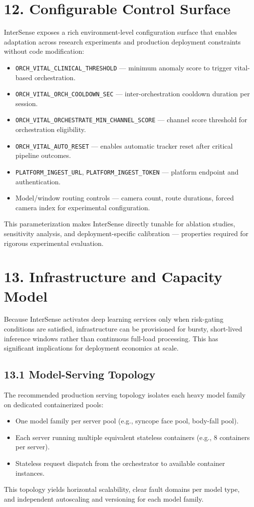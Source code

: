 \documentclass[11pt,a4paper]{article}
\begin{document}
\section{12. Configurable Control Surface}
InterSense exposes a rich environment-level configuration surface that enables adaptation across research experiments and production deployment constraints without code modification:
\begin{itemize}[leftmargin=1.4em]
  \item \texttt{ORCH\_VITAL\_CLINICAL\_THRESHOLD} — minimum anomaly score to trigger vital-based orchestration.
  \item \texttt{ORCH\_VITAL\_ORCH\_COOLDOWN\_SEC} — inter-orchestration cooldown duration per session.
  \item \texttt{ORCH\_VITAL\_ORCHESTRATE\_MIN\_CHANNEL\_SCORE} — channel score threshold for orchestration eligibility.
  \item \texttt{ORCH\_VITAL\_AUTO\_RESET} — enables automatic tracker reset after critical pipeline outcomes.
  \item \texttt{PLATFORM\_INGEST\_URL}, \texttt{PLATFORM\_INGEST\_TOKEN} — platform endpoint and authentication.
  \item Model/window routing controls — camera count, route durations, forced camera index for experimental configuration.
\end{itemize}
This parameterization makes InterSense directly tunable for ablation studies, sensitivity analysis, and deployment-specific calibration — properties required for rigorous experimental evaluation.

\section{13. Infrastructure and Capacity Model}
Because InterSense activates deep learning services only when risk-gating conditions are satisfied, infrastructure can be provisioned for bursty, short-lived inference windows rather than continuous full-load processing. This has significant implications for deployment economics at scale.

\subsection{13.1 Model-Serving Topology}
The recommended production serving topology isolates each heavy model family on dedicated containerized pools:
\begin{itemize}[leftmargin=1.4em]
  \item One model family per server pool (e.g., syncope face pool, body-fall pool).
  \item Each server running multiple equivalent stateless containers (e.g., 8 containers per server).
  \item Stateless request dispatch from the orchestrator to available container instances.
\end{itemize}
This topology yields horizontal scalability, clear fault domains per model type, and independent autoscaling and versioning for each model family.
\end{document}
